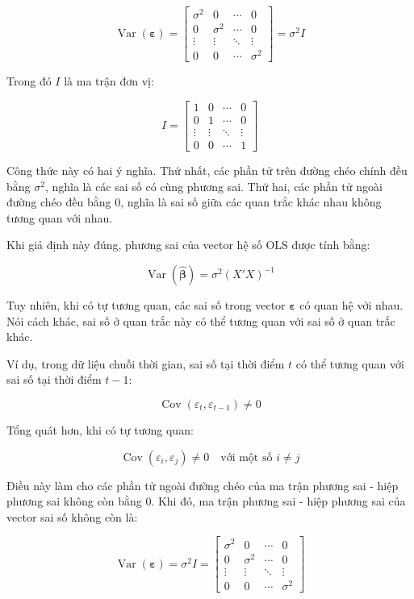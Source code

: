 \documentclass[12pt,a4paper]{article}
\begin{document}
\[
\operatorname{Var}(\boldsymbol{\varepsilon})
=
\begin{bmatrix}
\sigma^2 & 0 & \cdots & 0 \\
0 & \sigma^2 & \cdots & 0 \\
\vdots & \vdots & \ddots & \vdots \\
0 & 0 & \cdots & \sigma^2
\end{bmatrix} = \sigma^2 I
\] 

Trong đó \(I\) là ma trận đơn vị:

\[
I
=
\begin{bmatrix}
1 & 0 & \cdots & 0 \\
0 & 1 & \cdots & 0 \\
\vdots & \vdots & \ddots & \vdots \\
0 & 0 & \cdots & 1
\end{bmatrix}
\]

Công thức này có hai ý nghĩa. Thứ nhất, các phần tử trên đường chéo chính đều bằng \(\sigma^2\), nghĩa là các sai số có cùng phương sai. Thứ hai, các phần tử ngoài đường chéo đều bằng 0, nghĩa là sai số giữa các quan trắc khác nhau không tương quan với nhau.

Khi giả định này đúng, phương sai của vector hệ số OLS được tính bằng:

\[
\operatorname{Var}(\hat{\boldsymbol{\beta}})
=
\sigma^2(X'X)^{-1}
\]

Tuy nhiên, khi có tự tương quan, các sai số trong vector \(\boldsymbol{\varepsilon}\) có quan hệ với nhau. Nói cách khác, sai số ở quan trắc này có thể tương quan với sai số ở quan trắc khác.

Ví dụ, trong dữ liệu chuỗi thời gian, sai số tại thời điểm \(t\) có thể tương quan với sai số tại thời điểm \(t-1\):

\[
\operatorname{Cov}(\varepsilon_t,\varepsilon_{t-1}) \neq 0
\]

Tổng quát hơn, khi có tự tương quan:

\[
\operatorname{Cov}(\varepsilon_i,\varepsilon_j) \neq 0
\quad \text{với một số } i \neq j
\]

Điều này làm cho các phần tử ngoài đường chéo của ma trận phương sai - hiệp phương sai không còn bằng 0. Khi đó, ma trận phương sai - hiệp phương sai của vector sai số không còn là:

\[
\operatorname{Var}(\boldsymbol{\varepsilon})
=
\sigma^2 I
=
\begin{bmatrix}
\sigma^2 & 0 & \cdots & 0 \\
0 & \sigma^2 & \cdots & 0 \\
\vdots & \vdots & \ddots & \vdots \\
0 & 0 & \cdots & \sigma^2
\end{bmatrix}
\]
\end{document}
